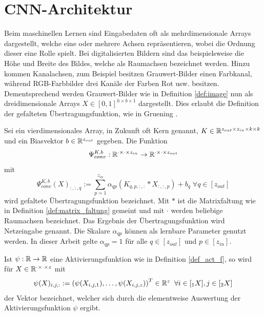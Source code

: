 \section{CNN-Architektur}
\label{abs:CNN_arch}
Beim maschinellen Lernen sind Eingabedaten oft als mehrdimensionale Arrays dargestellt, welche eine oder mehrere Achsen repräsentieren, wobei die Ordnung dieser eine Rolle spielt. Bei digitalisierten Bildern sind das beispielsweise die Höhe und Breite des Bildes, welche als Raumachsen bezeichnet werden. Hinzu kommen Kanalachsen, zum Beispiel besitzen Grauwert-Bilder einen Farbkanal, während RGB-Farbbilder drei Kanäle der Farben Rot usw. besitzen. Dementsprechend werden Grauwert-Bilder wie in Definition \ref{def:image} nun als dreidimensionale Arrays $X \in [0,1]^{h \times b \times 1}$ dargestellt. Dies erlaubt die Definition der gefalteten Übertragungsfunktion, wie in Gruening \cite{gruening}.

\begin{defi}
    \label{eq:convlogit}
    Sei ein vierdimensionales Array, in Zukunft oft Kern genannt, $K \in \mathbb{R}^{z_{out} \times z_{in} \times k \times k}$ und ein Biasvektor $b \in \mathbb{R}^{z_{out}}$ gegeben. Die Funktion 
    \begin{equation*}
        \Psi_{conv}^{K,b}: \mathbb{R}^{\cdot \times \cdot \times z_{in}} \rightarrow \mathbb{R}^{\cdot \times \cdot\times z_{out}}
    \end{equation*}
    mit
    \begin{equation*}
        \Psi_{conv}^{K,b}(X)_{:,:,q}:= \sum_{p=1}^{z_{in}} \alpha_{qp} \left(K_{q,p,:,:} \ast X_{:,:,p} \right) +b_q \; \forall q \in [z_{out}]
    \end{equation*}
    wird gefaltete Übertragungsfunktion bezeichnet. Mit $\ast$ ist die Matrixfaltung wie in Definition \ref{def:matrix_faltung} gemeint und mit $\cdot$ werden beliebige Raumachsen bezeichnet. Das Ergebnis der Übertragungsfunktion wird Netzeingabe genannt. Die Skalare $\alpha_{qp}$ können als lernbare Parameter genutzt werden. In dieser Arbeit gelte $\alpha_{qp}=1$ für alle $q \in [z_{out}]$ und $p \in [z_{in}]$.
\end{defi}


\begin{bem}
    Ist $\psi: \mathbb{R} \rightarrow \mathbb{R}$ eine Aktivierungsfunktion wie in Definition \ref{def_act_f}, so wird für $X \in \mathbb{R}^{\cdot \times \cdot \times z}$ mit 
    \[\psi(X)_{i,j,:}:=\left(\psi(X_{i,j,1}), \ldots, \psi(X_{i,j,z})\right)^T \in \mathbb{R}^z \; \; \forall i \in [{}_1 X], j \in [{}_2 X] 
    \]
    der Vektor bezeichnet, welcher sich durch die elementweise Auswertung der Aktivierungsfunktion $\psi$ ergibt.
\end{bem}

